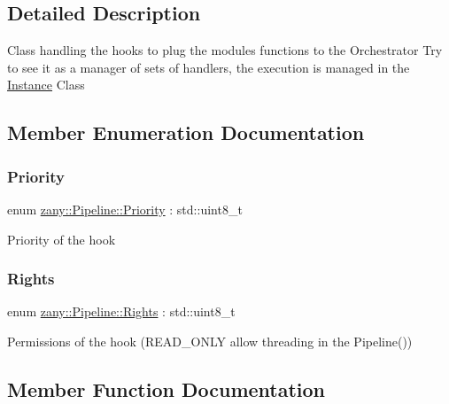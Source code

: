 \subsection{Detailed Description}
Class handling the hooks to plug the modules functions to the Orchestrator Try to see it as a manager of sets of handlers, the execution is managed in the \hyperlink{classzany_1_1_pipeline_1_1_instance}{Instance} Class 

\subsection{Member Enumeration Documentation}
\mbox{\label{classzany_1_1_pipeline_ab49de07eef2daaaa382e3a7b75c9e662}} 
\subsubsection{\texorpdfstring{Priority}{Priority}}
{\footnotesize\ttfamily enum \hyperlink{classzany_1_1_pipeline_ab49de07eef2daaaa382e3a7b75c9e662}{zany\+::\+Pipeline\+::\+Priority} \+: std\+::uint8\+\_\+t\hspace{0.3cm}{\ttfamily [strong]}}

Priority of the hook \mbox{\label{classzany_1_1_pipeline_a1d41e45c2e3e9716efd9e7ae6eae99be}} 
\subsubsection{\texorpdfstring{Rights}{Rights}}
{\footnotesize\ttfamily enum \hyperlink{classzany_1_1_pipeline_a1d41e45c2e3e9716efd9e7ae6eae99be}{zany\+::\+Pipeline\+::\+Rights} \+: std\+::uint8\+\_\+t\hspace{0.3cm}{\ttfamily [strong]}}

Permissions of the hook (R\+E\+A\+D\+\_\+\+O\+N\+LY allow threading in the Pipeline()) 

\subsection{Member Function Documentation}
\mbox{\label{classzany_1_1_pipeline_a80d8242dd8e8b94f92cc215f76427c49}} 
